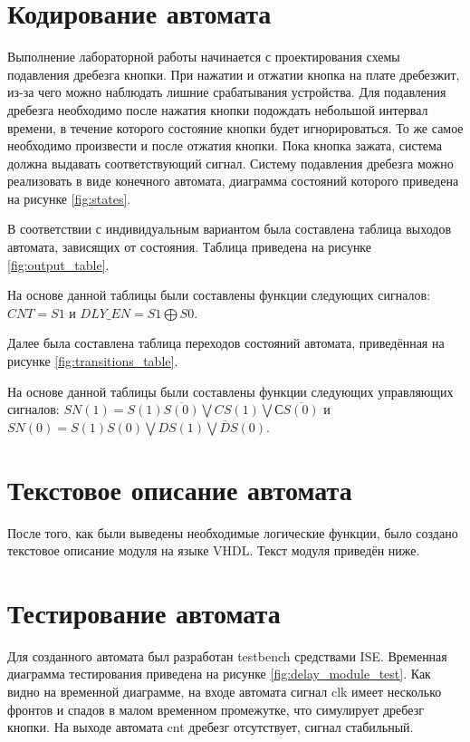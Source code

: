 \documentclass[a4paper, 14pt]{extarticle}
\begin{document}
    \section{Кодирование автомата}
    Выполнение лабораторной работы начинается с проектирования схемы подавления дребезга кнопки.
    При нажатии и отжатии кнопка на плате дребезжит, из-за чего можно наблюдать лишние срабатывания устройства.
    Для подавления дребезга необходимо после нажатия кнопки подождать небольшой интервал времени, в течение которого состояние кнопки будет игнорироваться.
    То же самое необходимо произвести и после отжатия кнопки. Пока кнопка зажата, система должна выдавать соответствующий сигнал.
    Систему подавления дребезга можно реализовать в виде конечного автомата, диаграмма состояний которого приведена на рисунке \ref{fig:states}.

    В соответствии с индивидуальным вариантом была составлена таблица выходов автомата, зависящих от состояния.
    Таблица приведена на рисунке \ref{fig:output_table}.

    На основе данной таблицы были составлены функции следующих сигналов: $CNT=S1$ и $DLY\_EN=S1\bigoplus S0$.

    Далее была составлена таблица переходов состояний автомата, приведённая на рисунке \ref{fig:transitions_table}.

    На основе данной таблицы были составлены функции следующих управляющих сигналов: $SN(1)=S(1)\overline{S(0)}\bigvee CS(1) \bigvee С\overline{S(0)}$ и $SN(0)=S(1)S(0) \bigvee DS(1) \bigvee \overline{D}S(0)$.

    \section{Текстовое описание автомата}
    После того, как были выведены необходимые логические функции, было создано текстовое описание модуля на языке VHDL. Текст модуля приведён ниже.

    \section{Тестирование автомата}
    Для созданного автомата был разработан testbench средствами ISE.
    Временная диаграмма тестирования приведена на рисунке \ref{fig:delay_module_test}.
    Как видно на временной диаграмме, на входе автомата сигнал clk имеет несколько фронтов и спадов в малом временном промежутке, что симулирует дребезг кнопки.
    На выходе автомата cnt дребезг отсутствует, сигнал стабильный.
\end{document}
